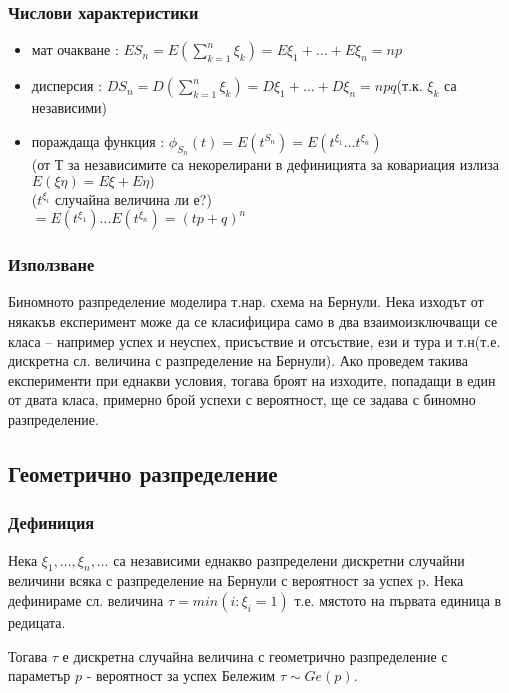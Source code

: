 \documentclass[fleqn,12pt]{article}
\begin{document}
\begin{justify}
\subsubsection{Числови характеристики}  
\begin{itemize}
    \item мат очакване : $ES_n = E(\sum_{k=1}^n \xi_k) = E\xi_1 + \dots + E\xi_n = n p$
    \item дисперсия : $DS_n = D(\sum_{k=1}^n \xi_k) = D\xi_1 + \dots + D\xi_n = n p q$(т.к. $\xi_k$ са независими)
    \item пораждаща функция : $\phi_{S_n}(t) = E(t^{S_n}) = E(t^{\xi_1} \dots t^{\xi_n})$ \\
    (от Т за независимите са некорелирани в дефиницията за ковариация излиза $E(\xi \eta) = E\xi + E\eta)$ \\
    ($t^{\xi_i}$ случайна величина ли е?) \\
    $=E(t^{\xi_1}) \dots E(t^{\xi_n}) = (tp + q)^n$ 
\end{itemize}

\subsubsection{Използване} 
Биномното разпределение моделира т.нар. схема на Бернули. Нека изходът от някакъв експеримент може да се класифицира
само в два взаимоизключващи се класа – например успех и неуспех, присъствие и отсъствие, ези и тура и т.н(т.е. дискретна
сл. величина с разпределение на Бернули). Ако проведем такива експерименти при еднакви условия, тогава броят на
изходите, попадащи в един от двата класа, примерно брой успехи с вероятност, ще се задава с биномно разпределение.

\subsection{Геометрично разпределение}
\subsubsection{Дефиниция} 
Нека $\xi_1, \dots, \xi_n, \dots$ са независими еднакво разпределени дискретни случайни величини всяка с разпределение 
на Бернули с вероятност за успех p.
Нека дефинираме сл. величина $\tau = min(i : \xi_i = 1)$ т.е. мястото на първата единица в редицата. 

Тогава $\tau$ е 
дискретна случайна величина с геометрично разпределение с параметър $p$ - вероятност за успех Бележим $\tau \sim Ge(p)$.


\end{justify}
\end{document}
